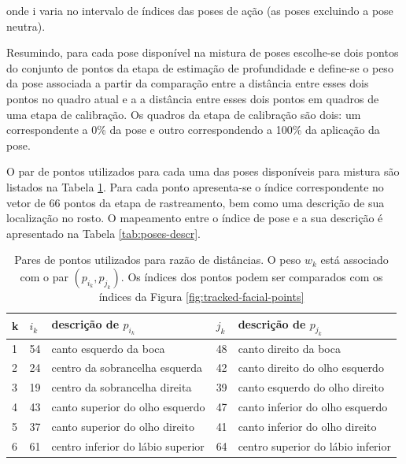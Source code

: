 onde i varia no intervalo de índices das poses de ação (as poses excluindo a
pose neutra).

Resumindo, para cada pose disponível na mistura de poses escolhe-se dois pontos
do conjunto de pontos da etapa de estimação de profundidade e define-se o peso
da pose associada a partir da comparação entre a  distância entre esses dois
pontos no quadro atual e a a distância entre esses dois pontos em quadros de uma
etapa de calibração. Os quadros da etapa de calibração são dois: um
correspondente a 0\% da pose e outro correspondendo a 100\% da aplicação da
pose.

O par de pontos utilizados para cada uma das poses disponíveis para mistura são
listados na Tabela \ref{tab:sensors}. Para cada ponto apresenta-se o índice
correspondente no vetor de 66 pontos da etapa de rastreamento, bem como uma
descrição de sua localização no rosto. O mapeamento entre o índice de pose e a
sua descrição é apresentado na Tabela \ref{tab:poses-descr}. 

\begin{table}[!htb]
\centering
\begin{tabular}{|l|l|l|l|l|}
\hline
k &  $i_k$ & descrição de $p_{i_k}$ & $j_k$ & descrição de $p_{j_k}$ \\ \hline
1 &  54 & canto esquerdo da boca & 48  & canto direito da boca \\ \hline
2 & 24 & centro da sobrancelha esquerda & 42 & canto direito do olho esquerdo \\ \hline
3 & 19 & centro da sobrancelha direita & 39 & canto esquerdo do olho direito \\ 	\hline
4 &  43 & canto superior do olho esquerdo & 47 & canto inferior do olho esquerdo \\ \hline
5 &  37 & canto superior do olho direito & 41 & canto inferior do olho direito \\ \hline
6 &  61 & centro inferior do lábio superior& 64 & centro superior do lábio inferior \\ \hline
\end{tabular}
\caption{Pares de pontos utilizados para razão de distâncias. O peso $w_k$ está associado com o par $(p_{i_k},p_{j_k})$. Os índices dos pontos podem ser comparados com os índices da Figura \ref{fig:tracked-facial-points}}
\label{tab:sensors}
\end{table}

